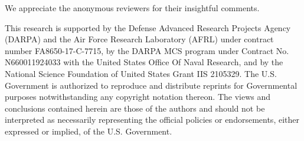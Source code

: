 \documentclass[11pt]{article}
\begin{document}
We appreciate the anonymous reviewers for their insightful comments.

This research is supported by the Defense Advanced Research Projects Agency (DARPA) and the Air Force Research Laboratory (AFRL) under contract number FA8650-17-C-7715, by the DARPA MCS program under Contract No. N660011924033 with the United States Office Of Naval Research, and by the National Science Foundation of United States Grant IIS 2105329.
The U.S. Government is authorized to reproduce and distribute reprints for Governmental purposes notwithstanding any copyright notation thereon. The views and conclusions contained herein are those of the authors and should not be interpreted as necessarily representing the official policies or endorsements, either expressed or implied, of the U.S. Government. 


\end{document}
